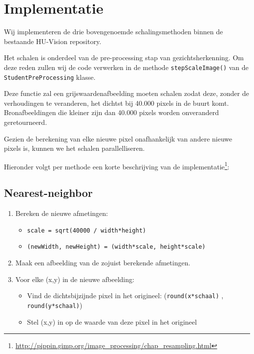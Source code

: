 \documentclass[a4paper]{article}
\begin{document}
\section{Implementatie}
\label{sec:org69b9377}
Wij implementeren de drie bovengenoemde schalingsmethoden binnen de
bestaande HU-Vision repository.

Het schalen is onderdeel van de pre-processing stap van
gezichtsherkenning. Om deze reden zullen wij de code verwerken in de
methode \texttt{stepScaleImage()} van de \texttt{StudentPreProcessing} klasse.

Deze functie zal een grijswaardenafbeelding moeten schalen zodat deze,
zonder de verhoudingen te veranderen, het dichtst bij 40.000 pixels in
de buurt komt. Bronafbeeldingen die kleiner zijn dan 40.000 pixels
worden onveranderd geretourneerd.

Gezien de berekening van elke nieuwe pixel onafhankelijk van andere
nieuwe pixels is, kunnen we het schalen parallelliseren.

Hieronder volgt per methode een korte beschrijving van de
implementatie\footnote{\url{http://pippin.gimp.org/image\_processing/chap\_resampling.html}}:

\subsection{Nearest-neighbor}
\label{sec:org6cbe652}
\begin{enumerate}
\item Bereken de nieuwe afmetingen:
\begin{itemize}
\item \texttt{scale = sqrt(40000 / width*height)}
\item \texttt{(newWidth, newHeight) = (width*scale, height*scale)}
\end{itemize}
\item Maak een afbeelding van de zojuist berekende afmetingen.
\item Voor elke (x,y) in de nieuwe afbeelding:
\begin{itemize}
\item Vind de dichtsbijzijnde pixel in het origineel:
(\texttt{round(x*schaal)} , \texttt{round(y*schaal)})
\item Stel (x,y) in op de waarde van deze pixel in het origineel
\end{itemize}
\end{enumerate}
\end{document}
